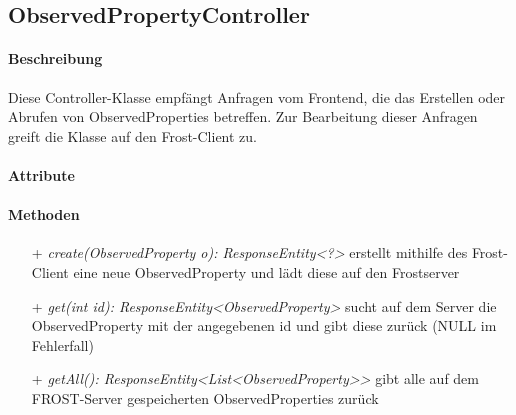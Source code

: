 \subsection{ObservedPropertyController}

\paragraph{Beschreibung}
Diese Controller-Klasse empfängt Anfragen vom Frontend, die das Erstellen oder Abrufen von ObservedProperties betreffen. Zur Bearbeitung dieser Anfragen greift die Klasse auf den Frost-Client zu.


\paragraph{Attribute}

\paragraph{Methoden}
\begin{itemize}
\item[+] \textit{ create(ObservedProperty o): ResponseEntity<?> }
erstellt mithilfe des Frost-Client eine neue ObservedProperty und lädt diese auf den Frostserver
\item[+] \textit{get(int id): ResponseEntity<ObservedProperty>}
sucht auf dem Server die ObservedProperty mit der angegebenen id und gibt diese zurück (NULL im Fehlerfall)
\item[+] \textit{getAll(): ResponseEntity<List<ObservedProperty>> }
gibt alle auf dem FROST-Server gespeicherten ObservedProperties zurück
\end{itemize}